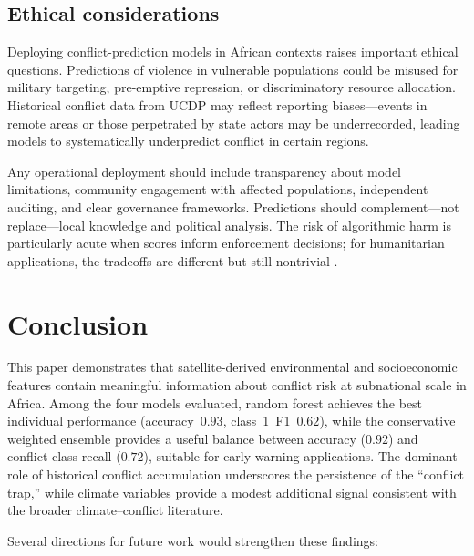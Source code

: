 \documentclass[11pt,a4paper]{article}
\begin{document}
\subsection{Ethical considerations}

Deploying conflict-prediction models in African contexts raises important ethical questions. Predictions of violence in vulnerable populations could be misused for military targeting, pre-emptive repression, or discriminatory resource allocation. Historical conflict data from UCDP may reflect reporting biases---events in remote areas or those perpetrated by state actors may be underrecorded, leading models to systematically underpredict conflict in certain regions.

Any operational deployment should include transparency about model limitations, community engagement with affected populations, independent auditing, and clear governance frameworks. Predictions should complement---not replace---local knowledge and political analysis. The risk of algorithmic harm is particularly acute when scores inform enforcement decisions; for humanitarian applications, the tradeoffs are different but still nontrivial \parencite{perry2013machines}.

\section{Conclusion}

This paper demonstrates that satellite-derived environmental and socioeconomic features contain meaningful information about conflict risk at subnational scale in Africa. Among the four models evaluated, random forest achieves the best individual performance (accuracy~$0.93$, class~1~F1~$0.62$), while the conservative weighted ensemble provides a useful balance between accuracy ($0.92$) and conflict-class recall ($0.72$), suitable for early-warning applications. The dominant role of historical conflict accumulation underscores the persistence of the ``conflict trap,'' while climate variables provide a modest additional signal consistent with the broader climate--conflict literature.

Several directions for future work would strengthen these findings:
\end{document}
